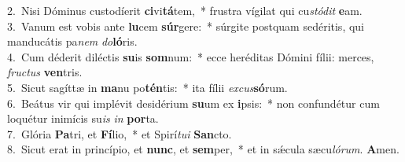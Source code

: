 {2.~}Nisi Dóminus custodíerit \textbf{ci}vi\textbf{tá}tem,~* frustra vígilat qui cu\textit{stó}\textit{dit} \textbf{e}am.\\
{3.~}Vanum est vobis ante \textbf{lu}cem \textbf{súr}gere:~* súrgite postquam sedéritis, qui manducátis pa\textit{nem} \textit{do}\textbf{ló}ris.\\
{4.~}Cum déderit diléctis \textbf{su}is \textbf{som}num:~* ecce heréditas Dómini fílii: merces, \textit{fru}\textit{ctus} \textbf{ven}tris.\\
{5.~}Sicut sagíttæ in \textbf{ma}nu po\textbf{tén}tis:~* ita fílii \textit{ex}\textit{cus}\textbf{só}rum.\\
{6.~}Beátus vir qui implévit desidérium \textbf{su}um ex \textbf{i}psis:~* non confundétur cum loquétur inimícis su\textit{is} \textit{in} \textbf{por}ta.\\
{7.~}Glória \textbf{Pa}tri, et \textbf{Fí}lio,~* et Spirí\textit{tu}\textit{i} \textbf{San}cto.\\
{8.~}Sicut erat in princípio, et \textbf{nunc}, et \textbf{sem}per,~* et in sǽcula sæcu\textit{ló}\textit{rum}. \textbf{A}men.\\
